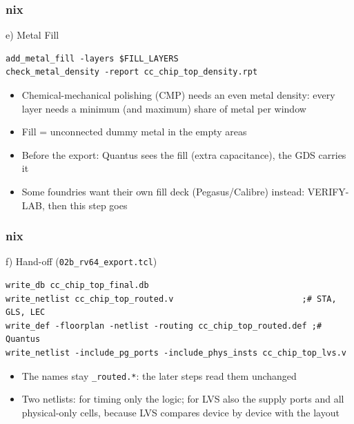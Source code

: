 \documentclass{beamer}
\newcommand{\astitle}{nix}
\newcommand{\assubtitle}{nix}
\newcommand{\cmd}[1]{\texttt{#1}}
\begin{document}
\renewcommand{\assubtitle}{e) Metal Fill}
\begin{frame}[fragile]
\frametitle{\astitle}
\begin{block}{\assubtitle}
\begin{lstlisting}[style=sh]
add_metal_fill -layers $FILL_LAYERS
check_metal_density -report cc_chip_top_density.rpt
\end{lstlisting}
  \begin{itemize}
    \item Chemical-mechanical polishing (CMP) needs an even metal density:
      every layer needs a minimum (and maximum) share of metal per window
    \item Fill = unconnected dummy metal in the empty areas
    \item Before the export: Quantus sees the fill (extra capacitance), the
      GDS carries it
    \item Some foundries want their own fill deck (Pegasus/Calibre) instead:
      VERIFY-LAB, then this step goes
  \end{itemize}
\end{block}
\end{frame}

\renewcommand{\assubtitle}{f) Hand-off (\texttt{02b\_rv64\_export.tcl})}
\begin{frame}[fragile]
\frametitle{\astitle}
\begin{block}{\assubtitle}
\begin{lstlisting}[style=sh]
write_db cc_chip_top_final.db
write_netlist cc_chip_top_routed.v                          ;# STA, GLS, LEC
write_def -floorplan -netlist -routing cc_chip_top_routed.def ;# Quantus
write_netlist -include_pg_ports -include_phys_insts cc_chip_top_lvs.v
\end{lstlisting}
  \begin{itemize}
    \item The names stay \cmd{\_routed.*}: the later steps read them
      unchanged
    \item Two netlists: for timing only the logic; for LVS also the supply
      ports and all physical-only cells, because LVS compares device by
      device with the layout
  \end{itemize}
\end{block}
\end{frame}
\end{document}
